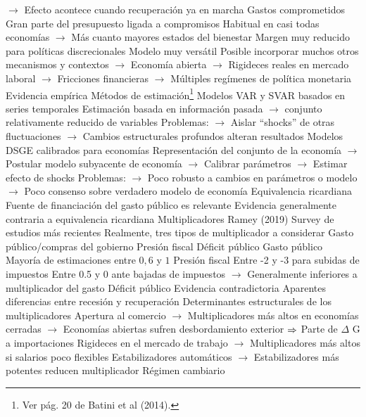 \documentclass{nuevotema}
\begin{document}
\begin{esquemal}
				\4[] $\to$ Efecto acontece cuando recuperación ya en marcha
			\3 Gastos comprometidos
				\4 Gran parte del presupuesto ligada a compromisos
				\4[] Habitual en casi todas economías
				\4[] $\to$ Más cuanto mayores estados del bienestar
				\4 Margen muy reducido para políticas discrecionales
				\4 Modelo muy versátil
				\4[] Posible incorporar muchos otros mecanismos y contextos
				\4[] $\to$ Economía abierta
				\4[] $\to$ Rigideces reales en mercado laboral
				\4[] $\to$ Fricciones financieras
				\4[] $\to$ Múltiples regímenes de política monetaria
		\2 Evidencia empírica
			\3 Métodos de estimación\footnote{Ver pág. 20 de Batini et al (2014).}
				\4 Modelos VAR y SVAR basados en series temporales
				\4[] Estimación basada en información pasada
				\4[] $\to$ conjunto relativamente reducido de variables
				\4[] Problemas:
				\4[] $\to$ Aislar ``shocks'' de otras fluctuaciones
				\4[] $\to$ Cambios estructurales profundos alteran resultados
				\4 Modelos DSGE calibrados para economías
				\4[] Representación del conjunto de la economía
				\4[] $\to$ Postular modelo subyacente de economía
				\4[] $\to$ Calibrar parámetros
				\4[] $\to$ Estimar efecto de shocks
				\4[] Problemas:
				\4[] $\to$ Poco robusto a cambios en parámetros o modelo
				\4[] $\to$ Poco consenso sobre verdadero modelo de economía
			\3 Equivalencia ricardiana
				\4 Fuente de financiación del gasto público es relevante
				\4 Evidencia generalmente contraria a equivalencia ricardiana
			\3 Multiplicadores
				\4 Ramey (2019)
				\4[] Survey de estudios más recientes
				\4 Realmente, tres tipos de multiplicador a considerar
				\4[] Gasto público/compras del gobierno
				\4[] Presión fiscal
				\4[] Déficit público
				\4 Gasto público
				\4[] Mayoría de estimaciones entre $0,6$ y $1$
				\4 Presión fiscal
				\4[] Entre -2 y -3 para subidas de impuestos
				\4[] Entre 0.5 y 0 ante bajadas de impuestos
				\4[] $\to$ Generalmente inferiores a multiplicador del gasto
				\4 Déficit público
				\4[] Evidencia contradictoria
				\4[] Aparentes diferencias entre recesión y recuperación
				\4 Determinantes estructurales de los multiplicadores
				\4[] Apertura al comercio
				\4[] $\to$ Multiplicadores más altos en economías cerradas
				\4[] $\to$ Economías abiertas sufren desbordamiento exterior
				\4[] $\Rightarrow$ Parte de $\Delta$ G a importaciones
				\4[] Rigideces en el mercado de trabajo
				\4[] $\to$ Multiplicadores más altos si salarios poco flexibles
				\4[] Estabilizadores automáticos
				\4[] $\to$ Estabilizadores más potentes reducen multiplicador
				\4[] Régimen cambiario

\end{esquemal}
\end{document}
